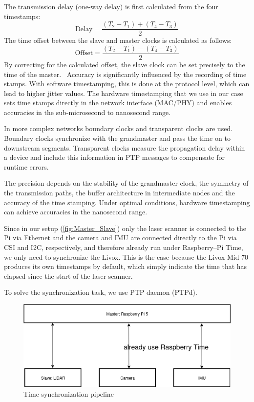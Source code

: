 \documentclass[english, bachelor, utf8]{base/thesis_telematics}
\begin{document}
The transmission delay
(one-way delay) is first calculated from the four timestamps:
\[
\text{Delay} = \frac{(T_2 - T_1) + (T_4 - T_3)}{2}
\]
The time offset between the slave and master clocks is calculated as follows:
\[
\text{Offset} = \frac{(T_2 - T_1) - (T_4 - T_3)}{2}
\]
By correcting for the calculated offset, the slave clock can be set precisely to
the time of the master.~\cite{hpePTP}
Accuracy is significantly influenced by the recording of time stamps. 
With software timestamping, this is done at the
protocol level, which can lead to higher jitter values. The
hardware timestamping that we use in our case sets time stamps 
directly in the network interface (MAC/PHY) and enables accuracies in the 
sub-microsecond to nanosecond range.~\cite{wikipediaPTP}

In more complex networks boundary clocks and
transparent clocks are used. Boundary clocks synchronize
with the grandmaster and pass the time on to downstream segments.
 Transparent clocks measure the propagation delay within
a device and include this information in PTP messages to
compensate for runtime errors.~\cite{eidson2002ieee}

The precision depends on the stability of the grandmaster clock, the
symmetry of the transmission paths, the buffer architecture in intermediate nodes
and the accuracy of the time stamping. Under optimal conditions,
 hardware timestamping can achieve accuracies in the nanosecond range.~\cite{hpePTP}

Since in our setup (\ref{fig:Master_Slave}) only the laser scanner is connected to the Pi via Ethernet
and the camera and IMU are connected directly to the Pi via CSI and I2C, respectively,
and therefore already run under Raspberry--Pi Time, we only need to synchronize the Livox.
This is the case because the Livox Mid-70 produces its own timestamps by default, 
which simply indicate the time that has elapsed since the start
of the laser scanner.

To solve the synchronization task, we use PTP daemon (PTPd).

\begin{figure}[h!]
    \centering
    \includegraphics[width=\textwidth]{pics/Master_Slave.png}
    \caption{Time synchronization pipeline}
    \label{fig:PTP}
\end{figure}
\end{document}
